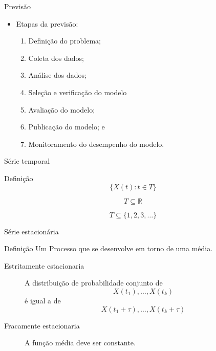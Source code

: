 \documentclass[compress,aspectratio=149,brazil]{beamer}
\begin{document}
\begin{frame}{Previsão}
    \begin{itemize}
        \item Etapas da previsão:
        \begin{enumerate}
            \item Definição do problema;
            \item Coleta dos dados;
            \item Análise dos dados;
            \item \alert<2>{Seleção e verificação do modelo}
            \item Avaliação do modelo;
            \item Publicação do modelo; e
            \item Monitoramento do desempenho do modelo.
        \end{enumerate}
    \end{itemize}
\end{frame}

\begin{frame}{Série temporal}
    \begin{block}{Definição}
        \[\{X(t): t \in T\}\]
    \end{block}
    \begin{description}
        \item<2->[Contínua]
            \[T \subseteq \mathbb{R}\]
        \item<2->[\alert<3>{Discreta}]
            \[T \subseteq \{1,2,3,\ldots\}\]
    \end{description}
\end{frame}

\begin{frame}{Série estacionária}
    \begin{block}{Definição}
        Um Processo que se desenvolve em torno de uma média.
        \begin{description}
            \item[Estritamente estacionaria]
                A distribuição de probabilidade conjunto de \[X(t_1), \ldots, X(t_k)\] é igual a de \[X(t_1+\tau), \ldots, X(t_k+\tau)\]
            \item[\alert<2>{Fracamente estacionaria}]
                A função média deve ser constante.
        \end{description}
    \end{block}
\end{frame}
\end{document}
